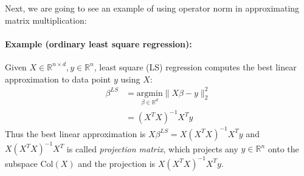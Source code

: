 \documentclass[11pt]{article}
\begin{document}
Next, we are going to see an example of using operator norm in approximating matrix multiplication:
\paragraph{Example (ordinary least square regression):}
Given $X\in\mathbb{R}^{n\times d}, y\in \mathbb{R}^n$, least square (LS) regression computes the best linear approximation to data point $y$ using $X$:
\begin{align*}
\beta^{LS} &= \underset{\beta\in\mathbb{R}^d}{\text{argmin}}\|X\beta - y\|_2^2\\
&= (X^TX)^{-1}X^Ty
\end{align*}
Thus the best linear approximation is $X\beta^{LS}=X(X^TX)^{-1}X^Ty$ and $X(X^TX)^{-1}X^T$ is called \emph{projection matrix}, which projects any $y\in \mathbb{R}^n$ onto the subspace $\text{Col}(X)$ and the projection is $X(X^TX)^{-1}X^Ty$.
\end{document}

